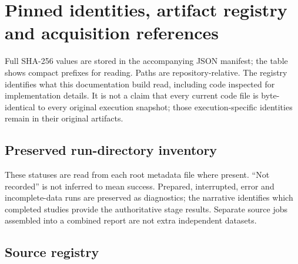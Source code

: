 \chapter{Pinned identities, artifact registry and acquisition references}
Full SHA-256 values are stored in the accompanying JSON manifest; the table shows compact prefixes for reading. Paths are repository-relative. The registry identifies what this documentation build read, including code inspected for implementation details. It is not a claim that every current code file is byte-identical to every original execution snapshot; those execution-specific identities remain in their original artifacts.

\section{Preserved run-directory inventory}
These statuses are read from each root metadata file where present. ``Not recorded'' is not inferred to mean success. Prepared, interrupted, error and incomplete-data runs are preserved as diagnostics; the narrative identifies which completed studies provide the authoritative stage results. Separate source jobs assembled into a combined report are not extra independent datasets.

\section{Source registry}


